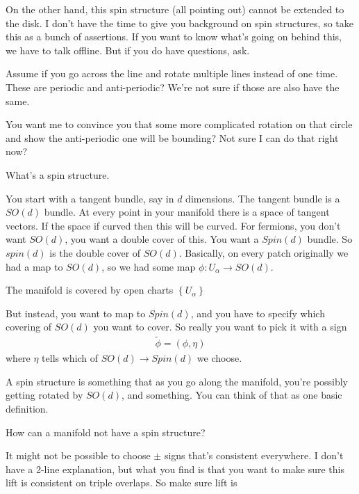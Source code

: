 On the other hand,
this spin structure (all pointing out) cannot be extended to the disk.
I don't have the time to give you background on spin structures,
so take this as a bunch of assertions.
If you want to know what's going on behind this,
we have to talk offline.
But if you do have questions, ask.

\begin{question}
    Assume if you go across the line and rotate multiple lines instead of one
    time.
    These are periodic and anti-periodic?
    We're not sure if those are also have the same.
\end{question}
You want me to convince you that some more complicated rotation on that circle
and show the anti-periodic one will be bounding?
Not sure I can do that right now?

\begin{question}
    What's a spin structure.
\end{question}
You start with a tangent bundle,
say in $d$ dimensions.
The tangent bundle is a $SO(d)$ bundle.
At every point in your manifold there is a space of tangent vectors.
If the space if curved then this will be curved.
For fermions, you don't want $SO(d)$,
you want a double cover of this.
You want a $Spin(d)$ bundle.
So $spin(d)$ is the double cover of $SO(d)$.
Basically,
on every patch originally we had a map to $SO(d)$,
so we had some map $\phi:U_\alpha\to SO(d)$.

The manifold is covered by open charts $\left\{ U_\alpha \right\}$

But instead,
you want to map to $Spin(d)$,
and you have to specify which covering of $SO(d)$ you want to cover.
So really you want to pick it with a sign
\begin{align}
    \tilde{\phi} = (\phi, \eta)
\end{align}
where $\eta$  tells which of $SO(d)\to Spin(d)$
we choose.

A spin structure is something that as you go along the manifold,
you're possibly getting rotated by $SO(d)$,
and something.
You can think of that as one basic definition.

\begin{question}
    How can a manifold not have a spin structure?
\end{question}
It might not be possible to choose $\pm$ signs that's consistent everywhere.
I don't have a 2-line explanation,
but what you find is that you want to make sure this lift is consistent on
triple overlaps.
So make sure lift is 

